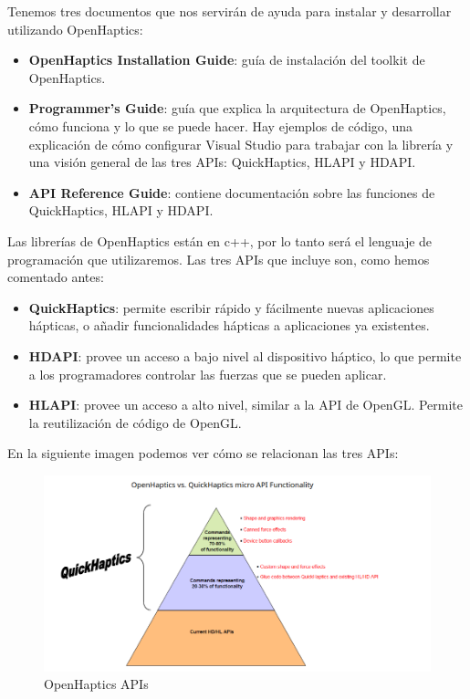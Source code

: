 \documentclass[a4paper,11pt, oneside]{book}
\begin{document}
Tenemos tres documentos que nos servirán de ayuda para instalar y desarrollar utilizando OpenHaptics:
\begin{itemize}
	\item \textbf{OpenHaptics Installation Guide}: guía de instalación del toolkit de OpenHaptics.
	\item \textbf{Programmer’s Guide}: guía que explica la arquitectura de OpenHaptics, cómo funciona y lo que se puede hacer. Hay ejemplos de código, una explicación de cómo configurar Visual Studio para trabajar con la librería y una visión general de las tres APIs: QuickHaptics, HLAPI y HDAPI.
	\item \textbf{API Reference Guide}: contiene documentación sobre las funciones de QuickHaptics, HLAPI y HDAPI.
\end{itemize}

Las librerías de OpenHaptics están en c++, por lo tanto será el lenguaje de programación que utilizaremos. Las tres APIs que incluye son, como hemos comentado antes:
\begin{itemize}
	\item \textbf{QuickHaptics}: permite escribir rápido y fácilmente nuevas aplicaciones hápticas, o añadir funcionalidades hápticas a aplicaciones ya existentes.  
	\item \textbf{HDAPI}: provee un acceso a bajo nivel al dispositivo háptico, lo que permite a los programadores controlar las fuerzas que se pueden aplicar. 
	\item \textbf{HLAPI}: provee un acceso a alto nivel, similar a la API de OpenGL. Permite la reutilización de código de OpenGL.
\end{itemize}
En la siguiente imagen podemos ver cómo se relacionan las tres APIs:


\begin{figure}[H]
	
	\centering
	\includegraphics[width=\linewidth]{OPENHAPTICS}
	\caption{OpenHaptics APIs}
	\label{fig:figura1}
	
\end{figure}
\end{document}

